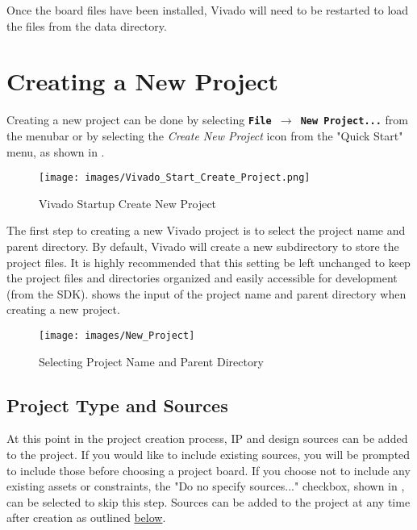 \noindent
Once the board files have been installed, Vivado will need to be restarted to load the files from the data directory.

\section{Creating a New Project}

Creating a new project can be done by selecting \texttt{\bfseries File $\rightarrow$ New Project...} from the menubar or by selecting the \textit{Create New Project} icon from the "Quick Start" menu, as shown in . \\


\begin{figure}
	\centering
	\texttt{[image: images/Vivado\_Start\_Create\_Project.png]}
	\caption[Vivado Startup Create New Project]{Vivado Startup Create New Project}
	\label{fig:vivadostartcreate}
\end{figure}


\noindent
The first step to creating a new Vivado project is to select the project name and parent directory. By default, Vivado will create a new subdirectory to store the project files. It is highly recommended that this setting be left unchanged to keep the project files and directories organized and easily accessible for development (\ie from the SDK).  shows the input of the project name and parent directory when creating a new project. \\

\begin{figure}
	\centering
	\texttt{[image: images/New\_Project]}
	\caption{Selecting Project Name and Parent Directory}
	\label{fig:vivadonewprojectname}
\end{figure}

\subsection{Project Type and Sources}
At this point in the project creation process, IP and design sources can be added to the project. If you would like to include existing sources, you will be prompted to include those before choosing a project board. If you choose not to include any existing assets or constraints, the "Do no specify sources..." checkbox, shown in , can be selected to skip this step. Sources can be added to the project at any time after creation as outlined \hyperref[sub:addsources]{below}.\\

